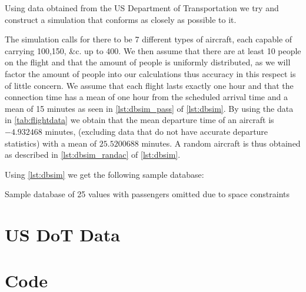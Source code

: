 \documentclass[titlepage]{article}
\numberwithin{equation}{section}
\begin{document}
Using data obtained from the US Department of Transportation \cite{USDoTData} we try and construct a simulation that conforms as closely as possible to it. 

The simulation calls for there to be 7 different types of aircraft, each capable of carrying 100,150, \&c. up to 400. We then assume that there are  at least 10 people on the flight and that the amount of people is uniformly distributed, as we will factor the amount of people into our calculations thus accuracy in this respect is of little concern.
We assume that each flight lasts exactly one hour and that the connection time has a mean of one hour from the scheduled arrival time and a mean of 15 minutes as seen in \autoref{lst:dbsim_pass} of \autoref{lst:dbsim}. By using the data in \autoref{tab:flightdata} we obtain that the mean departure time of an aircraft is $-4.932468$ minutes, (excluding data that do not have accurate departure statistics) with a mean of $25.5200688$ minutes. A random aircraft is thus obtained as described in \autoref{lst:dbsim_randac} of \autoref{lst:dbsim}.



Using \autoref{lst:dbsim} we get the following sample database:

\begin{table}[h!]
\caption{Sample database of 25 values with passengers omitted due to space constraints}
\label{tab:sampledata}
\centering
{}
\end{table}


\newpage
\begin{appendices}
\section{US DoT Data}

\DTLsetseparator{,}


\newpage
\section{Code}

\newpage


\end{appendices}

\newpage
{}


\end{document}
